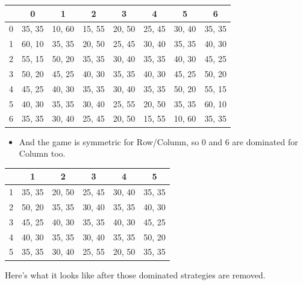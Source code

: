 \documentclass[
  14pt,
  letterpaper,
  ignorenonframetext,
  aspectratio=169,
  handout]{beamer}
\providecommand{\tightlist}{%
  \setlength{\itemsep}{0pt}\setlength{\parskip}{0pt}}\usepackage{longtable,booktabs,array}
\let\olditem\item
\renewcommand{\item}{%
\olditem\vspace{6pt}}
\begin{document}
\begin{frame}[plain]{}
\protect\hypertarget{section-4}{}
\begin{table}[!h]
\centering
\begin{tabular}[t]{>{}r|ccccccc}
\toprule
 & 0 & 1 & 2 & 3 & 4 & 5 & 6\\
\midrule
0 & 35, 35 & 10, 60 & 15, 55 & 20, 50 & 25, 45 & 30, 40 & 35, 35\\
1 & 60, 10 & 35, 35 & 20, 50 & 25, 45 & 30, 40 & 35, 35 & 40, 30\\
2 & 55, 15 & 50, 20 & 35, 35 & 30, 40 & 35, 35 & 40, 30 & 45, 25\\
3 & 50, 20 & 45, 25 & 40, 30 & 35, 35 & 40, 30 & 45, 25 & 50, 20\\
4 & 45, 25 & 40, 30 & 35, 35 & 30, 40 & 35, 35 & 50, 20 & 55, 15\\
5 & 40, 30 & 35, 35 & 30, 40 & 25, 55 & 20, 50 & 35, 35 & 60, 10\\
6 & 35, 35 & 30, 40 & 25, 45 & 20, 50 & 15, 55 & 10, 60 & 35, 35\\
\bottomrule
\end{tabular}
\end{table}

\begin{itemize}[<+->]
\tightlist
\item
  And the game is symmetric for Row/Column, so 0 and 6 are dominated for
  Column too.
\end{itemize}
\end{frame}

\begin{frame}[plain]{}
\protect\hypertarget{section-5}{}
\begin{table}[!h]
\centering
\begin{tabular}[t]{>{}r|ccccc}
\toprule
 & 1 & 2 & 3 & 4 & 5\\
\midrule
1 & 35, 35 & 20, 50 & 25, 45 & 30, 40 & 35, 35\\
2 & 50, 20 & 35, 35 & 30, 40 & 35, 35 & 40, 30\\
3 & 45, 25 & 40, 30 & 35, 35 & 40, 30 & 45, 25\\
4 & 40, 30 & 35, 35 & 30, 40 & 35, 35 & 50, 20\\
5 & 35, 35 & 30, 40 & 25, 55 & 20, 50 & 35, 35\\
\bottomrule
\end{tabular}
\end{table}

Here's what it looks like after those dominated strategies are removed.
\end{frame}
\end{document}
